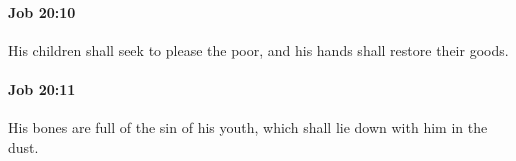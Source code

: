 		\paragraph{Job 20:10} %
			\label{JOB-20-10}

			His children shall seek to please the poor, and his hands shall restore their goods.


		\paragraph{Job 20:11} %
			\label{JOB-20-11}

			His bones are full of the sin of his youth, which shall lie down with him in the dust.


